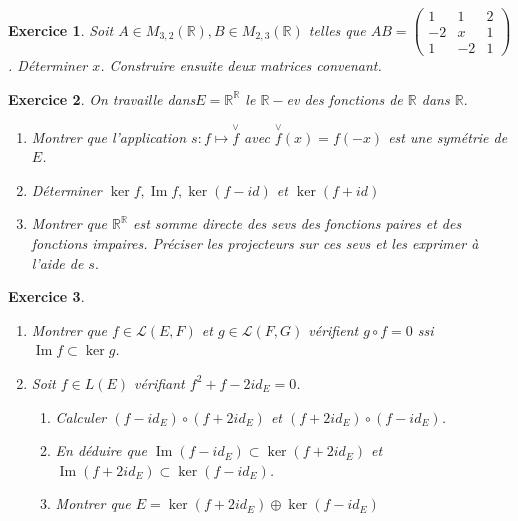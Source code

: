 \documentclass[12pt,a4paper]{article}
\newcommand{\R}{\mathbb{R}}
\newcommand{\C}{\mathbb{C}}
\DeclareMathOperator{\Ima }{Im}
\theoremstyle{break}
\theoremstyle{break}
\newtheorem{Exo}{Exercice}
\begin{document}
\begin{Exo}
	Soit $A\in M_{3,2}\left( \mathbb{R} \right),B\in M_{2,3}\left( \mathbb{R} \right)$ telles que $AB=\left( \begin{matrix} 1& 1& 2\\ -2& x& 1\\ 1& -2& 1\end{matrix} \right)$. Déterminer $x$. Construire ensuite deux matrices convenant.
\end{Exo}

\begin{Exo}
	 On travaille dans$E=\R^{\R}$ le $\R-$ev des fonctions de $\R$ dans $\R.$

\begin{enumerate}
	\item Montrer que l'application $s:f\mapsto \overset{\vee }{f}$ avec $\overset{\vee }{f}\left( x\right) =f\left( -x\right) $ est une symétrie de $E$.
	
	\item Déterminer $\ker f,\Ima  f,\ker \left( f-id\right) $ et $\ker \left( f+id\right) $
	
	\item Montrer que $\R^{\R}$ est somme directe des sevs des fonctions paires et des fonctions impaires. Préciser les projecteurs sur ces sevs et les exprimer à l'aide de $s.$
\end{enumerate}
\end{Exo}




\begin{Exo}\ 
	\begin{enumerate}
	\item
	Montrer que  $f \in \mathcal{L}(E,F)$ et  $g \in \mathcal{L}(F,G)$ vérifient $g \circ f=0$ ssi $\Ima f \subset \ker g$.
	\item Soit $f\in L(E)$ vérifiant $f^2+f-2id_{E}=0$.
	\begin{enumerate}
		\item Calculer $(f-id_{E})\circ (f+2id_{E})$ et $(f+2id_{E})\circ (f-id_{E})$.
		\item En déduire que $\Ima (f-id_{E})\subset \ker (f+2id_{E})$ et $\Ima (f+2id_{E})\subset \ker (f-id_{E})$.
		\item Montrer que $E=\ker (f+2id_{E})\oplus \ker (f-id_{E})$
	\end{enumerate}
\end{enumerate}
\end{Exo}

%
%
\end{document}
